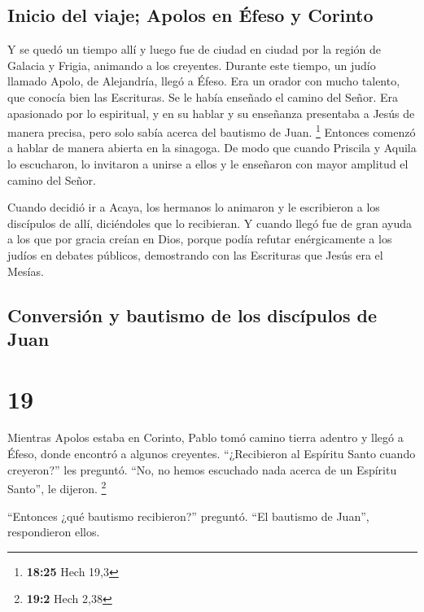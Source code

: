 \hypertarget{inicio-del-viaje-apolos-en-uxe9feso-y-corinto}{%
\subsection{Inicio del viaje; Apolos en Éfeso y
Corinto}\label{inicio-del-viaje-apolos-en-uxe9feso-y-corinto}}

 Y se quedó un tiempo allí y luego fue de ciudad en
ciudad por la región de Galacia y Frigia, animando a los creyentes.
 Durante este tiempo, un judío llamado Apolo, de
Alejandría, llegó a Éfeso. Era un orador con mucho talento, que conocía
bien las Escrituras.  Se le había enseñado el camino del
Señor. Era apasionado por lo espiritual, y en su hablar y su enseñanza
presentaba a Jesús de manera precisa, pero solo sabía acerca del
bautismo de Juan. \footnote{\textbf{18:25} Hech 19,3} 
Entonces comenzó a hablar de manera abierta en la sinagoga. De modo que
cuando Priscila y Aquila lo escucharon, lo invitaron a unirse a ellos y
le enseñaron con mayor amplitud el camino del Señor.

 Cuando decidió ir a Acaya, los hermanos lo animaron y le
escribieron a los discípulos de allí, diciéndoles que lo recibieran. Y
cuando llegó fue de gran ayuda a los que por gracia creían en Dios,
 porque podía refutar enérgicamente a los judíos en
debates públicos, demostrando con las Escrituras que Jesús era el
Mesías.

\hypertarget{conversiuxf3n-y-bautismo-de-los-discuxedpulos-de-juan}{%
\subsection{Conversión y bautismo de los discípulos de
Juan}\label{conversiuxf3n-y-bautismo-de-los-discuxedpulos-de-juan}}

\hypertarget{section-18}{%
\section{19}\label{section-18}}

 Mientras Apolos estaba en Corinto, Pablo tomó camino
tierra adentro y llegó a Éfeso, donde encontró a algunos creyentes.
 ``¿Recibieron al Espíritu Santo cuando creyeron?'' les
preguntó. ``No, no hemos escuchado nada acerca de un Espíritu Santo'',
le dijeron. \footnote{\textbf{19:2} Hech 2,38}

 ``Entonces ¿qué bautismo recibieron?'' preguntó. ``El
bautismo de Juan'', respondieron ellos.

